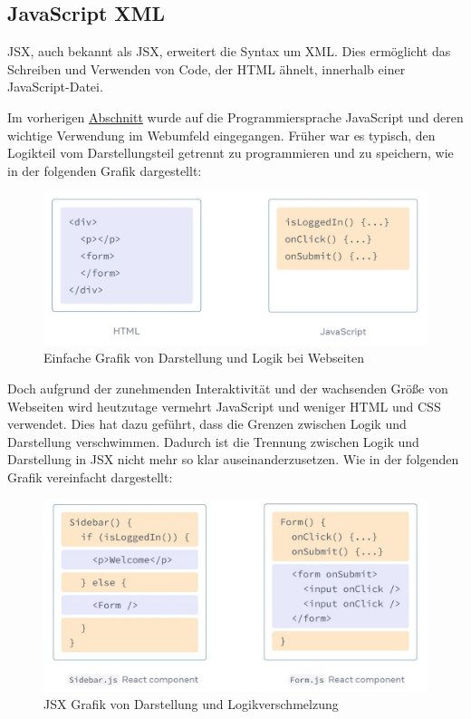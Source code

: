 \subsection{JavaScript XML}

\acl{JSX}, auch bekannt als \acs{JSX}, erweitert die Syntax um \acl{XML}. Dies ermöglicht das Schreiben und Verwenden von Code, der \acs{HTML} ähnelt, innerhalb einer JavaScript-Datei.

Im vorherigen \hyperref[chapter:3-javaScript]{Abschnitt} wurde auf die Programmiersprache JavaScript und deren wichtige Verwendung im Webumfeld eingegangen. Früher war es typisch, den Logikteil vom Darstellungsteil getrennt zu programmieren und zu speichern, wie in der folgenden Grafik dargestellt:

\begin{figure}[h]
    \centering
    \includegraphics[width=1\textwidth]{images/02/ReactJS-JSX.jpeg}
    \caption{Einfache Grafik von Darstellung und Logik bei Webseiten\cite{react-jsx-html, react-jsx-javascript}}
\end{figure}

Doch aufgrund der zunehmenden Interaktivität und der wachsenden Größe von Webseiten wird heutzutage vermehrt JavaScript und weniger \acs{HTML} und \acs{CSS} verwendet. Dies hat dazu geführt, dass die Grenzen zwischen Logik und Darstellung verschwimmen. Dadurch ist die Trennung zwischen Logik und Darstellung in \acs{JSX} nicht mehr so klar auseinanderzusetzen. Wie in der folgenden Grafik vereinfacht dargestellt:

\begin{figure}[h]
    \centering
    \includegraphics[width=1\textwidth]{images/02/ReactJS-JSX-Component.jpeg}
    \caption{JSX Grafik von Darstellung und Logikverschmelzung\cite{react-jsx-form-component, react-jsx-sidebar-component}}
\end{figure}

